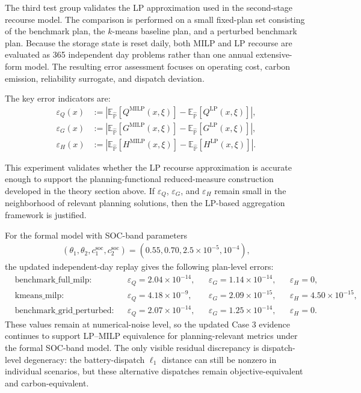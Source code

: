 The third test group validates the LP approximation used in the second-stage recourse model. The comparison is performed on a small fixed-plan set consisting of the benchmark plan, the $k$-means baseline plan, and a perturbed benchmark plan. Because the storage state is reset daily, both MILP and LP recourse are evaluated as 365 independent day problems rather than one annual extensive-form model. The resulting error assessment focuses on operating cost, carbon emission, reliability surrogate, and dispatch deviation.

The key error indicators are:
\begin{align}
\varepsilon_Q(x) &:= \left|\mathbb{E}_{\widehat{\mathbb{P}}}[Q^{\mathrm{MILP}}(x,\xi)] - \mathbb{E}_{\widehat{\mathbb{P}}}[Q^{\mathrm{LP}}(x,\xi)]\right|,
\label{eq:10a-lp-cost-error}\\
\varepsilon_G(x) &:= \left|\mathbb{E}_{\widehat{\mathbb{P}}}[G^{\mathrm{MILP}}(x,\xi)] - \mathbb{E}_{\widehat{\mathbb{P}}}[G^{\mathrm{LP}}(x,\xi)]\right|,
\label{eq:10a-lp-carbon-error}\\
\varepsilon_H(x) &:= \left|\mathbb{E}_{\widehat{\mathbb{P}}}[H^{\mathrm{MILP}}(x,\xi)] - \mathbb{E}_{\widehat{\mathbb{P}}}[H^{\mathrm{LP}}(x,\xi)]\right|.
\label{eq:10a-lp-reliability-error}
\end{align}

This experiment validates whether the LP recourse approximation is accurate enough to support the planning-functional reduced-measure construction developed in the theory section above. If \(\varepsilon_Q\), \(\varepsilon_G\), and \(\varepsilon_H\) remain small in the neighborhood of relevant planning solutions, then the LP-based aggregation framework is justified.

For the formal model with SOC-band parameters
\begin{align}
(\theta_1,\theta_2,c^{\mathrm{soc}}_1,c^{\mathrm{soc}}_2)=(0.55,0.70,2.5\times 10^{-5},10^{-4}),
\end{align}
the updated independent-day replay gives the following plan-level errors:
\begin{align}
&\text{benchmark\_full\_milp:} && \varepsilon_Q = 2.04\times 10^{-14}, && \varepsilon_G = 1.14\times 10^{-14}, && \varepsilon_H = 0,\\
&\text{kmeans\_milp:} && \varepsilon_Q = 4.18\times 10^{-9}, && \varepsilon_G = 2.09\times 10^{-15}, && \varepsilon_H = 4.50\times 10^{-15},\\
&\text{benchmark\_grid\_perturbed:} && \varepsilon_Q = 2.07\times 10^{-14}, && \varepsilon_G = 1.25\times 10^{-14}, && \varepsilon_H = 0.
\end{align}
These values remain at numerical-noise level, so the updated Case 3 evidence continues to support LP--MILP equivalence for planning-relevant metrics under the formal SOC-band model. The only visible residual discrepancy is dispatch-level degeneracy: the battery-dispatch \(\ell_1\) distance can still be nonzero in individual scenarios, but these alternative dispatches remain objective-equivalent and carbon-equivalent.

